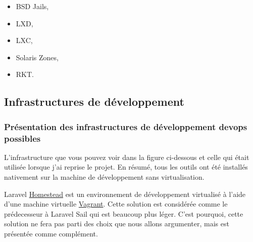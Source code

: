 \documentclass[
    iai, %
    il, %
]{heig-tb}
\begin{document}
\begin{itemize}
    \item BSD Jails, %
    \item LXD, %
    \item LXC, %
    \item Solaris Zones, %
    \item RKT. %
\end{itemize}

\subsection{Infrastructures de développement}

\subsubsection{Présentation des infrastructures de développement \Gls{devops} possibles}
L'infrastructure que vous pouvez voir dans la figure ci-dessous et celle qui était utilisée lorsque j'ai reprise le projet.
En résumé, tous les outils ont été installés nativement sur la machine de développement sans virtualisation.



Laravel \href{https://laravel.com/docs/9.x/homestead}{Homestead} est un environnement de développement virtualisé à l'aide d'une machine virtuelle \href{https://www.vagrantup.com/}{Vagrant}.
Cette solution est considérée comme le prédecesseur à Laravel Sail qui est beaucoup plus léger.
C'est pourquoi, cette solution ne fera pas parti des choix que nous allons argumenter, mais est présentée comme complément.
\end{document}
